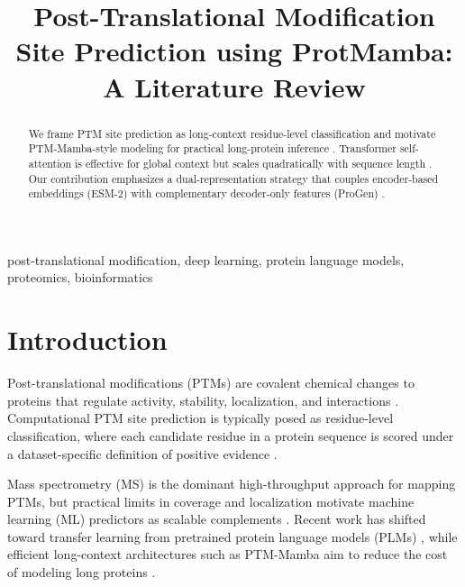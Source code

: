 \documentclass[conference]{IEEEtran}
\begin{document}
\title{Post-Translational Modification Site Prediction using ProtMamba: A Literature Review
}

\author{
}

\maketitle

\begin{abstract}
We frame PTM site prediction as long-context residue-level classification and motivate PTM-Mamba-style modeling for practical long-protein inference \cite{peng2024ptm}. Transformer self-attention is effective for global context but scales quadratically with sequence length \cite{vaswani2017attention}. Our contribution emphasizes a dual-representation strategy that couples encoder-based embeddings (ESM-2) \cite{lin2022} with complementary decoder-only features (ProGen) \cite{madani2020progen}.
\end{abstract}

\begin{IEEEkeywords}
post-translational modification, deep learning, protein language models, proteomics, bioinformatics
\end{IEEEkeywords}

\section{Introduction}
Post-translational modifications (PTMs) are covalent chemical changes to proteins that regulate activity, stability, localization, and interactions \cite{zhong2023ptm}. Computational PTM site prediction is typically posed as residue-level classification, where each candidate residue in a protein sequence is scored under a dataset-specific definition of positive evidence \cite{li2022dbptm}.

Mass spectrometry (MS) is the dominant high-throughput approach for mapping PTMs, but practical limits in coverage and localization motivate machine learning (ML) predictors as scalable complements \cite{messner2023mass}. Recent work has shifted toward transfer learning from pretrained protein language models (PLMs) \cite{elnaggar2021prottranscrackinglanguagelifes,elnaggar2020,lin2022}, while efficient long-context architectures such as PTM-Mamba aim to reduce the cost of modeling long proteins \cite{peng2024ptm}.
\end{document}
